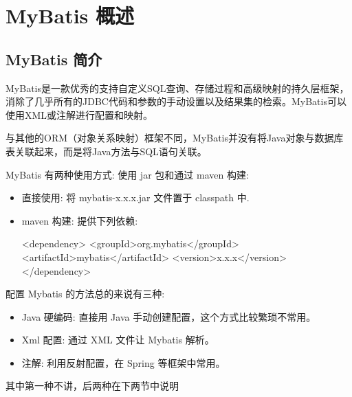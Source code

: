 \section{MyBatis 概述}

\subsection{MyBatis 简介}

MyBatis是一款优秀的支持自定义SQL查询、存储过程和高级映射的持久层框架，消除了几乎所有的JDBC代码和参数的手动设置以及结果集的检索。MyBatis可以使用XML或注解进行配置和映射。

与其他的ORM（对象关系映射）框架不同，MyBatis并没有将Java对象与数据库表关联起来，而是将Java方法与SQL语句关联。

MyBatis 有两种使用方式: 使用 jar 包和通过 maven 构建:
\begin{itemize}
    \item 直接使用: 将 mybatis-x.x.x.jar 文件置于 classpath 中.
    \item maven 构建: 提供下列依赖:
\begin{xml}
<dependency>
    <groupId>org.mybatis</groupId>
    <artifactId>mybatis</artifactId>
    <version>x.x.x</version>
</dependency>
\end{xml}
\end{itemize}

配置 Mybatis 的方法总的来说有三种:
\begin{itemize}
    \item Java 硬编码: 直接用 Java 手动创建配置，这个方式比较繁琐不常用。
    \item Xml 配置: 通过 XML 文件让 Mybatis 解析。
    \item 注解: 利用反射配置，在 Spring 等框架中常用。
\end{itemize}

其中第一种不讲，后两种在下两节中说明